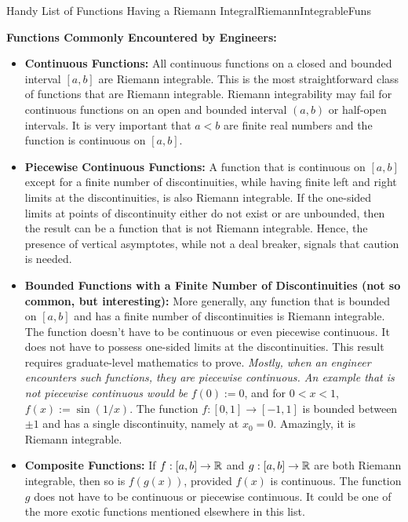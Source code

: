 \begin{propColor}{Handy List of Functions Having a Riemann Integral}{RiemannIntegrableFuns}

\textbf{Functions Commonly Encountered by Engineers:}
\begin{itemize}
    \item \textbf{Continuous Functions: } All continuous functions on a closed and bounded interval $[a, b]$ are Riemann integrable. This is the most straightforward class of functions that are Riemann integrable. Riemann integrability may fail for continuous functions on an open and bounded interval $(a, b)$ or half-open intervals. It is very important that $a < b$ are finite real numbers and the function is continuous on $[a, b]$.  
    
    \item \textbf{Piecewise Continuous Functions: } A function that is continuous on $[a, b]$ except for a finite number of discontinuities, while having finite left and right limits at the discontinuities, is also Riemann integrable. If the one-sided limits at points of discontinuity either do not exist or are unbounded, then the result can be a function that is not Riemann integrable. Hence, the presence of vertical asymptotes, while not a deal breaker, signals that caution is needed. 
    
    \item \textbf{Bounded Functions with a Finite Number of Discontinuities (not so common, but interesting):}  More generally, any function that is bounded on $[a, b]$ and has a finite number of discontinuities is Riemann integrable. The function doesn't have to be continuous or even piecewise continuous. It does not have to possess one-sided limits at the discontinuities. This result requires graduate-level mathematics to prove. \textit{Mostly, when an engineer encounters such functions, they are piecewise continuous. An example that is not piecewise continuous would be} $f(0):=0$, and for $0 < x < 1$, $f(x) := \sin(1/x)$. The function $f:[0, 1] \to [-1, 1]$ is bounded between $\pm 1$ and has a single discontinuity, namely at $x_0=0$. Amazingly, it is Riemann integrable. 
    
    \item \textbf{Composite Functions:} If $f:[a, b] \to \mathbb R$ and $g: [a, b] \to \mathbb R$ are both Riemann integrable, then so is $f(g(x))$, provided $f(x)$ is continuous. The function $g$ does not have to be continuous or piecewise continuous. It could be one of the more exotic functions mentioned elsewhere in this list. 


\end{itemize}
\end{propColor}
